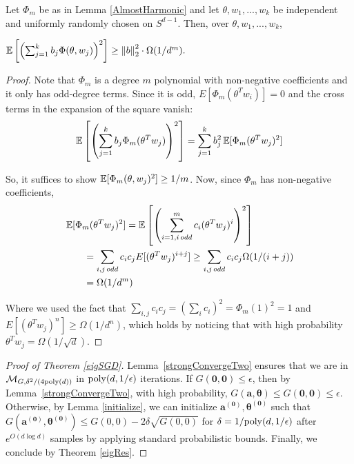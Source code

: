 \begin{lemma}\label{largeVariance}
  Let $\Phi_m$ be as in Lemma \ref{AlmostHarmonic}  and let $\theta, w_1,...,w_k$ be
  independent and uniformly randomly chosen on $S^{d-1}$. Then, over
  $\theta, w_1,...,w_k$,
 
 $\operatorname*{\mathbb{E}}\left[\left(  \sum_{j=1}^k b_j \Phi(\theta,w_j)\right)^2\right]
 \geq \left\lVert b \right\rVert_2^2 \cdot \Omega(1/d^m).$
\end{lemma}
%
\begin{proof}
Note that $\Phi_m$ is a degree $m$ polynomial with non-negative coefficients and it only has odd-degree terms. Since it is odd, $E[\Phi_m(\theta^Tw_i)] = 0$ and the cross terms in the expansion of the square vanish:
%
\[ \operatorname*{\mathbb{E}}\left[\left(  \sum_{j=1}^k b_j
     \Phi_m(\theta^Tw_j)\right)^2\right] = \sum_{j=1}^k b_j^2 \operatorname*{\mathbb{E}}[\Phi_m(\theta^Tw_j)^2]\]

So, it suffices to show $\operatorname*{\mathbb{E}}[\Phi_m(\theta,w_j)^2] \geq 1/m$.  Now, since $\Phi_m$ has non-negative coefficients,
\begin{align*}
& \operatorname*{\mathbb{E}}[\Phi_m(\theta^Tw_j)^2] = \operatorname*{\mathbb{E}}\left[\left(\sum_{i=1, i \,
                               odd}^m c_i
                               (\theta^Tw_j)^i\right)^2\right] \\
& \qquad = \sum_{i,j \,odd} c_ic_j E[(\theta^Tw_j)^{i+j}] \geq \sum_{i,j
  \,odd}c_i c_j \Omega(1/(i+j))  \\
& \qquad =\Omega(1/d^m) 
\end{align*}

Where we used the fact that
$\sum_{i,j} c_ic_j = (\sum_i c_i)^2 = \Phi_m(1)^2 = 1$ and
$E[(\theta^Tw_j)^{n}] \geq \Omega(1/d^{n})$, which holds by noticing that with high probability $\theta^T w_j = \Omega(1/\sqrt{d})$. 
\end{proof}

\fi 
 
\begin{proof}[Proof of Theorem \ref{eigSGD}]
Lemma~\ref{strongConvergeTwo} ensures that we are in $\mathcal{M}_{G,\delta^2/(4\mathrm{poly}(d))}$ in $\mathrm{poly}(d,1/\epsilon)$ iterations.
If $G(\boldsymbol{0,0}) \leq \epsilon$, then by Lemma~\ref{strongConvergeTwo}, with high probability, $G(\boldsymbol{a,\theta}) \leq G(\boldsymbol{0,0}) \leq \epsilon$. Otherwise, by Lemma \ref{initialize},  we can initialize $\boldsymbol{a^{(0)},\theta^{(0)}}$ such that $G(\boldsymbol{a^{(0)},\theta^{(0)}}) \leq  G(0,0) - 2\delta \sqrt{G(0,0)}$ for $\delta = 1/\mathrm{poly}(d,1/\epsilon)$ after $e^{O(d\log d)}$ samples by applying standard probabilistic bounds. Finally, we conclude by Theorem \ref{eigRes}.
\end{proof}
%

